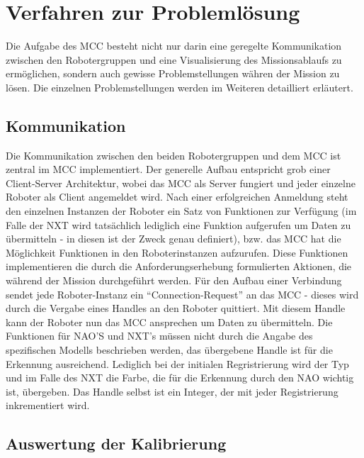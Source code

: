\section{Verfahren zur Problemlösung}
Die Aufgabe des MCC besteht nicht nur darin eine geregelte Kommunikation zwischen den Robotergruppen und eine Visualisierung des Missionsablaufs zu ermöglichen, sondern auch gewisse Problemstellungen währen der Mission zu lösen. Die einzelnen Problemstellungen werden im Weiteren detailliert erläutert.

\subsection{Kommunikation}
Die Kommunikation zwischen den beiden Robotergruppen und dem MCC ist zentral im MCC implementiert. Der generelle Aufbau entspricht grob einer Client-Server Architektur, wobei das MCC als 
Server fungiert und jeder einzelne Roboter als Client angemeldet wird. Nach einer erfolgreichen Anmeldung steht den einzelnen Instanzen der Roboter ein Satz von Funktionen zur Verfügung
(im Falle der NXT wird tatsächlich lediglich eine Funktion aufgerufen um Daten zu übermitteln - in diesen ist der Zweck genau definiert), bzw. das MCC hat die Möglichkeit Funktionen in den 
Roboterinstanzen aufzurufen. Diese Funktionen implementieren die durch die Anforderungserhebung formulierten Aktionen, die während der 
Mission durchgeführt werden. Für den Aufbau einer Verbindung sendet jede Roboter-Instanz ein ``Connection-Request'' an das MCC - dieses wird durch die Vergabe eines Handles an den Roboter quittiert. 
Mit diesem Handle kann der Roboter nun das MCC ansprechen um Daten zu übermitteln. Die Funktionen für NAO'S und NXT's müssen nicht durch die Angabe des spezifischen Modells beschrieben werden,
das übergebene Handle ist für die Erkennung ausreichend. Lediglich bei der initialen Regristrierung wird der Typ und im Falle des NXT die Farbe, die für die Erkennung durch den NAO wichtig ist, 
übergeben. Das Handle selbst ist ein Integer, der mit jeder Registrierung inkrementiert wird.

\subsection{Auswertung der Kalibrierung}

